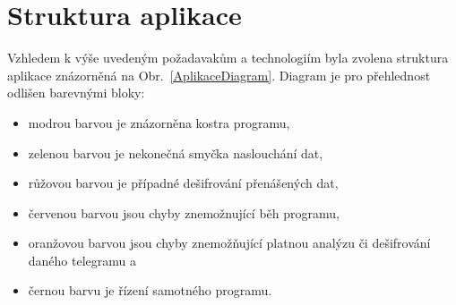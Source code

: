 \section{Struktura aplikace}
Vzhledem k výše uvedeným požadavakům a technologiím byla zvolena struktura aplikace znázorněná na Obr.~\ref{AplikaceDiagram}. Diagram je pro přehlednost odlišen barevnými bloky:
\begin{itemize}
	\item modrou barvou je znázorněna kostra programu,
	\item zelenou barvou je nekonečná smyčka naslouchání dat,
	\item růžovou barvou je případné dešifrování přenášených dat,
	\item červenou barvou jsou chyby znemožnující běh programu,
	\item oranžovou barvou jsou chyby znemožňující platnou analýzu či dešifrování daného telegramu a
	\item černou barvu je řízení samotného programu.
\end{itemize}

